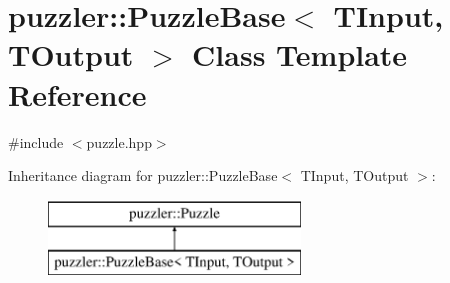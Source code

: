 \hypertarget{a00027}{}\section{puzzler\+:\+:Puzzle\+Base$<$ T\+Input, T\+Output $>$ Class Template Reference}
\label{a00027}


{\ttfamily \#include $<$puzzle.\+hpp$>$}

Inheritance diagram for puzzler\+:\+:Puzzle\+Base$<$ T\+Input, T\+Output $>$\+:\begin{figure}[H]
\begin{center}
\leavevmode
\includegraphics[height=2.000000cm]{a00027}
\end{center}
\end{figure}
